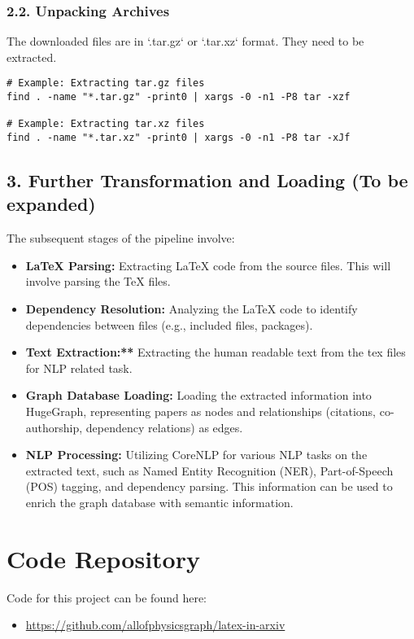\documentclass{article}
\begin{document}
\subsubsection{2.2. Unpacking Archives}

The downloaded files are in `.tar.gz` or `.tar.xz` format. They need to be extracted.

\begin{lstlisting}
# Example: Extracting tar.gz files
find . -name "*.tar.gz" -print0 | xargs -0 -n1 -P8 tar -xzf

# Example: Extracting tar.xz files
find . -name "*.tar.xz" -print0 | xargs -0 -n1 -P8 tar -xJf
\end{lstlisting}

\subsection{3.  Further Transformation and Loading (To be expanded)}

The subsequent stages of the pipeline involve:

\begin{itemize}
    \item \textbf{LaTeX Parsing:} Extracting LaTeX code from the source files. This will involve parsing the TeX files.
    \item \textbf{Dependency Resolution:}  Analyzing the LaTeX code to identify dependencies between files (e.g., included files, packages).
    \item \textbf{Text Extraction:**}  Extracting the human readable text from the tex files for NLP related task.
    \item \textbf{Graph Database Loading:} Loading the extracted information into HugeGraph, representing papers as nodes and relationships (citations, co-authorship, dependency relations) as edges.
    \item \textbf{NLP Processing:}  Utilizing CoreNLP for various NLP tasks on the extracted text, such as Named Entity Recognition (NER), Part-of-Speech (POS) tagging, and dependency parsing.  This information can be used to enrich the graph database with semantic information.
\end{itemize}

\section{Code Repository}
Code for this project can be found here:

\begin{itemize}
    \item \href{https://github.com/allofphysicsgraph/latex-in-arxiv}{https://github.com/allofphysicsgraph/latex-in-arxiv}
\end{itemize}
\end{document}
